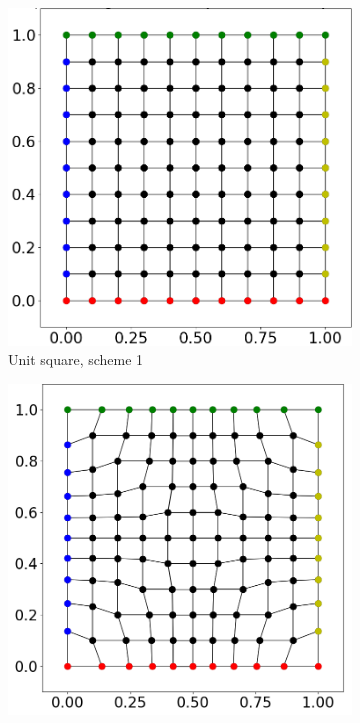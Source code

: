 \begin{figure}%
  \centering%
  \begin{subfigure}[t]{0.48\textwidth}%
    \centering%
    \includegraphics[width=\textwidth]{images/fiber_creation/quad_1.png}%
    \caption{Unit square, scheme 1}%
    \label{fig:quad_1}%
  \end{subfigure}
  \quad
  \begin{subfigure}[t]{0.48\textwidth}%
    \centering%
    \includegraphics[width=\textwidth]{images/fiber_creation/quad_2.png}%

\end{subfigure}
\end{figure}
